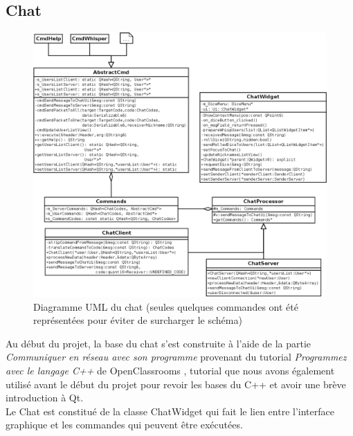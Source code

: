 \subsection{Chat}

\begin{figure}[h!]
	\centering
	\includegraphics[width=\textwidth]{img/chat_uml.png}
	\caption{Diagramme UML du chat (seules quelques commandes ont été représentées pour éviter de surcharger le schéma)}
\end{figure}

Au début du projet, la base du chat s'est construite à l'aide de la partie \emph{Communiquer en réseau avec son programme} provenant du tutorial \emph{Programmez avec le langage C++} de OpenClassrooms \cite{cite:oc:cpp}, tutorial que nous avons également utilisé avant le début du projet pour revoir les bases du C++ et avoir une brève introduction à Qt.\\

Le Chat est constitué de la classe ChatWidget qui fait le lien entre l'interface graphique et les commandes qui peuvent être exécutées.\\

